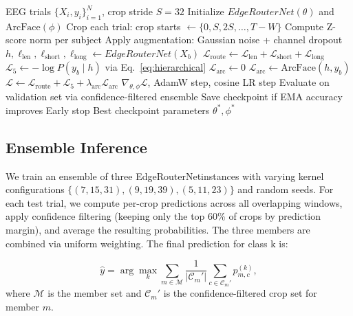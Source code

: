 \documentclass[conference]{IEEEtran}
\newcommand{\method}{EdgeRouterNet}
\begin{document}
\begin{algorithm}[t]
	\caption{Training procedure for \method}
	\label{alg:training}
	\begin{algorithmic}
		 EEG trials $\{X_i, y_i\}_{i=1}^N$, crop stride $S=32$
		\STATE Initialize $\method(\theta)$ and $\text{ArcFace}(\phi)$
		\STATE Crop each trial: crop starts $\leftarrow \{0, S, 2S, \ldots, T-W\}$
		\STATE Compute Z-score norm per subject
		\STATE Apply augmentation: Gaussian noise + channel dropout
		\STATE $h, \ell_{\text{len}}, \ell_{\text{short}}, \ell_{\text{long}} \leftarrow \method(X_b)$
		\STATE $\mathcal{L}_{\text{route}} \leftarrow \mathcal{L}_{\text{len}} + \mathcal{L}_{\text{short}} + \mathcal{L}_{\text{long}}$
		\STATE $\mathcal{L}_{5} \leftarrow -\log P(y_b \mid h)$ via Eq.~\ref{eq:hierarchical}
		\STATE $\mathcal{L}_{\text{arc}} \leftarrow 0$
		\STATE $\mathcal{L}_{\text{arc}} \leftarrow \text{ArcFace}(h, y_b)$
		\ENDIF
		\STATE $\mathcal{L} \leftarrow \mathcal{L}_{\text{route}} + \mathcal{L}_5 + \lambda_{\text{arc}} \mathcal{L}_{\text{arc}}$
		\STATE $\nabla_{\theta,\phi}\mathcal{L}$, AdamW step, cosine LR step
		\ENDFOR
		\STATE Evaluate on validation set via confidence-filtered ensemble
		\STATE Save checkpoint if EMA accuracy improves
		 \STATE Early stop \ENDIF
		\ENDIF
		\ENDFOR
		 Best checkpoint parameters $\theta^*, \phi^*$
	\end{algorithmic}
\end{algorithm}

\subsection{Ensemble Inference}
We train an ensemble of three \method instances with varying kernel configurations $\{(7, 15, 31), (9, 19, 39), (5, 11, 23)\}$ and random seeds. For each test trial, we compute per-crop predictions across all overlapping windows, apply confidence filtering (keeping only the top 60\% of crops by prediction margin), and average the resulting probabilities. The three members are combined via uniform weighting. The final prediction for class k is:

\begin{equation}
	\hat{y} = \arg\max_k \sum_{m \in \mathcal{M}} \frac{1}{|\mathcal{C}_m'|} \sum_{c \in \mathcal{C}_m'} p_{m,c}^{(k)},
\end{equation}
where $\mathcal{M}$ is the member set and $\mathcal{C}_m'$ is the confidence-filtered crop set for member $m$.
\end{document}
